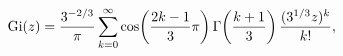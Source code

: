 \[\mathop{\mathrm{Gi}\/}\nolimits\!\left(z\right)=\frac{3^{-2/3}}{\pi}\*\sum_{k=%
0}^{\infty}\mathop{\cos\/}\nolimits\!\left(\frac{2k-1}{3}\pi\right)\mathop{%
\Gamma\/}\nolimits\!\left(\frac{k+1}{3}\right)\frac{(3^{1/3}z)^{k}}{k!},\]